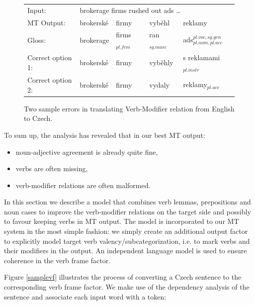 \documentclass[11pt]{report}
\theoremstyle{plain}
\begin{document}
{{\begin{figure}
\begin{center}
{
\small
\begin{tabular}{|lllll|}
\hline
Input:  &  \multicolumn{4}{l|}{brokerage firms rushed out ads \dots}\\
MT Output:  &  brokersk\'{e}  &  firmy  &  vyb\v{e}hl  &  reklamy\\
Gloss:  &  brokerage  &  firms$_{pl.fem}$  &  ran$_{sg.masc}$  &  ads$_{pl.nom,pl.acc}^{pl.voc,sg.gen}$\\
Correct option 1:  &  brokersk\'{e}  &  firmy  &  vyb\v{e}hly  &  s reklamami$_{pl.instr}$\\
Correct option 2:  &  brokersk\'{e}  &  firmy  &  vydaly  &  reklamy$_{pl.acc}$\\
\hline
\end{tabular}
}
\end{center}
\caption{Two sample errors in translating Verb-Modifier relation from English to
Czech.}
\label{sampleerrors}
\end{figure}







To sum up, the analysis has revealed that in our best MT output:

\begin{itemize}

\item noun-adjective agreement is already quite fine,

\item verbs are often missing,

\item verb-modifier relations are often malformed.
\end{itemize}




In this section we describe a model that combines verb lemmas, prepositions and
noun cases to improve the verb-modifier relations on the target side and
possibly to favour keeping verbs in MT output. The model
is incorporated to our MT system in the most simple fashion: we simply create an
additional output factor to explicitly model target verb
valency/subcategorization, i.e. to mark verbs and their modifiers in the output.
An independent language model is used to ensure coherence in the verb frame
factor.

Figure \ref{samplevf} illustrates the process of converting a Czech sentence to
the corresponding verb frame factor. We make use of the dependency analysis of
the sentence and associate each input word with a token:

}}
\end{document}
